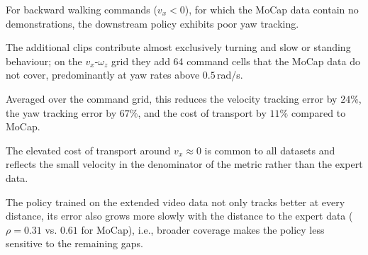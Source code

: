 
For backward walking commands ($v_x < 0$), for which the MoCap data contain no demonstrations, the downstream policy exhibits poor yaw tracking.

The additional clips contribute almost exclusively turning and slow or standing behaviour; on the $v_x$-$\omega_z$ grid they add 64 command cells that the MoCap data do not cover, predominantly at yaw rates above $0.5\,$rad/s.

Averaged over the command grid, this reduces the velocity tracking error by $24\%$, the yaw tracking error by $67\%$, and the cost of transport by $11\%$ compared to MoCap.

The elevated cost of transport around $v_x \approx 0$ is common to all datasets and reflects the small velocity in the denominator of the metric rather than the expert data.

The policy trained on the extended video data not only tracks better at every distance, its error also grows more slowly with the distance to the expert data ($\rho = 0.31$ vs. $0.61$ for MoCap), i.e., broader coverage makes the policy less sensitive to the remaining gaps.

